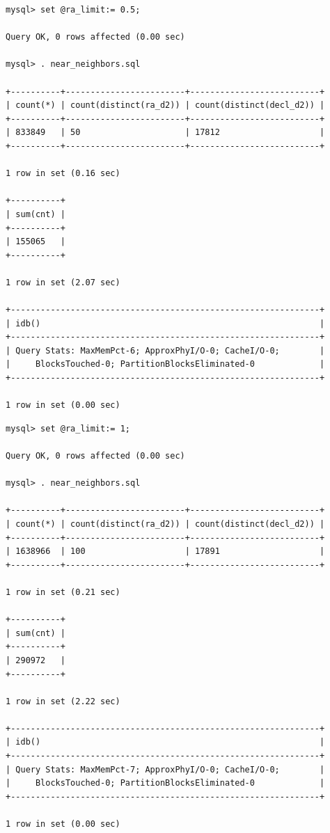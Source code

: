 \documentclass[DM,lsstdraft,toc]{lsstdoc}
\begin{document}
\begin{verbatim}
mysql> set @ra_limit:= 0.5;

Query OK, 0 rows affected (0.00 sec)

mysql> . near_neighbors.sql

+----------+------------------------+--------------------------+
| count(*) | count(distinct(ra_d2)) | count(distinct(decl_d2)) |
+----------+------------------------+--------------------------+
| 833849   | 50                     | 17812                    |
+----------+------------------------+--------------------------+

1 row in set (0.16 sec)

+----------+
| sum(cnt) |
+----------+
| 155065   |
+----------+

1 row in set (2.07 sec)

+--------------------------------------------------------------+
| idb()                                                        |
+--------------------------------------------------------------+
| Query Stats: MaxMemPct-6; ApproxPhyI/O-0; CacheI/O-0;        |
|     BlocksTouched-0; PartitionBlocksEliminated-0             |
+--------------------------------------------------------------+

1 row in set (0.00 sec)
\end{verbatim}

\begin{verbatim}
mysql> set @ra_limit:= 1;

Query OK, 0 rows affected (0.00 sec)

mysql> . near_neighbors.sql

+----------+------------------------+--------------------------+
| count(*) | count(distinct(ra_d2)) | count(distinct(decl_d2)) |
+----------+------------------------+--------------------------+
| 1638966  | 100                    | 17891                    |
+----------+------------------------+--------------------------+

1 row in set (0.21 sec)

+----------+
| sum(cnt) |
+----------+
| 290972   |
+----------+

1 row in set (2.22 sec)

+--------------------------------------------------------------+
| idb()                                                        |
+--------------------------------------------------------------+
| Query Stats: MaxMemPct-7; ApproxPhyI/O-0; CacheI/O-0;        |
|     BlocksTouched-0; PartitionBlocksEliminated-0             |
+--------------------------------------------------------------+

1 row in set (0.00 sec)
\end{verbatim}
\end{document}
